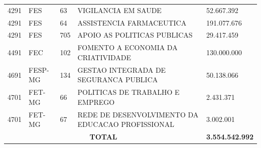 \documentclass{article}
\begin{document}
\begin{longtable}[c]{m{1cm}|m{1.5cm}|m{1cm}m{10cm}|m{2cm}}
\multicolumn{1}{C{1cm}|}{4291} & \multicolumn{1}{L{1.5cm}|}{FES} & \multicolumn{1}{C{1cm}|}{63} & \multicolumn{1}{L{10cm}|}{VIGILANCIA EM SAUDE} & \multicolumn{1}{R{2cm}}{52.667.392} \\
\multicolumn{1}{C{1cm}|}{4291} & \multicolumn{1}{L{1.5cm}|}{FES} & \multicolumn{1}{C{1cm}|}{64} & \multicolumn{1}{L{10cm}|}{ASSISTENCIA FARMACEUTICA} & \multicolumn{1}{R{2cm}}{191.077.676} \\
\multicolumn{1}{C{1cm}|}{4291} & \multicolumn{1}{L{1.5cm}|}{FES} & \multicolumn{1}{C{1cm}|}{705} & \multicolumn{1}{L{10cm}|}{APOIO AS POLITICAS PUBLICAS} & \multicolumn{1}{R{2cm}}{29.417.459} \\
\multicolumn{1}{C{1cm}|}{4491} & \multicolumn{1}{L{1.5cm}|}{FEC} & \multicolumn{1}{C{1cm}|}{102} & \multicolumn{1}{L{10cm}|}{FOMENTO A ECONOMIA DA CRIATIVIDADE} & \multicolumn{1}{R{2cm}}{130.000.000} \\
\multicolumn{1}{C{1cm}|}{4691} & \multicolumn{1}{L{1.5cm}|}{FESP-MG} & \multicolumn{1}{C{1cm}|}{134} & \multicolumn{1}{L{10cm}|}{GESTAO INTEGRADA DE SEGURANCA PUBLICA} & \multicolumn{1}{R{2cm}}{50.138.066} \\
\multicolumn{1}{C{1cm}|}{4701} & \multicolumn{1}{L{1.5cm}|}{FET-MG} & \multicolumn{1}{C{1cm}|}{66} & \multicolumn{1}{L{10cm}|}{POLITICAS DE TRABALHO E EMPREGO} & \multicolumn{1}{R{2cm}}{2.431.371} \\
\multicolumn{1}{C{1cm}|}{4701} & \multicolumn{1}{L{1.5cm}|}{FET-MG} & \multicolumn{1}{C{1cm}|}{67} & \multicolumn{1}{L{10cm}|}{REDE DE DESENVOLVIMENTO DA EDUCACAO PROFISSIONAL} & \multicolumn{1}{R{2cm}}{3.002.001} \\
\hline
\multicolumn{4}{c|}{ \textbf{TOTAL}} & \multicolumn{1}{R{2cm}}{ \textbf{3.554.542.992}} \\\hline\hline\end{longtable}\raggedright\fontsize{7pt}{10pt}\selectfont {Fonte: PPO.} \\\fontsize{7pt}{10pt}\selectfont {ELABORAÇÃO: DCAF/SCPPO/SEPLAG}\\\fontsize{7pt}{10pt}\selectfont {Nota: Na elaboração desse relatório foram consideradas as fontes de recurso 1, 2, 3, 4, 5, 6, 7, 8, 16, 17, 21, 24, 36, 37, 38, 56, 57, 62, 63, 64, 65, 73, 92, 93, 97 e 98.}\\
\end{document}
